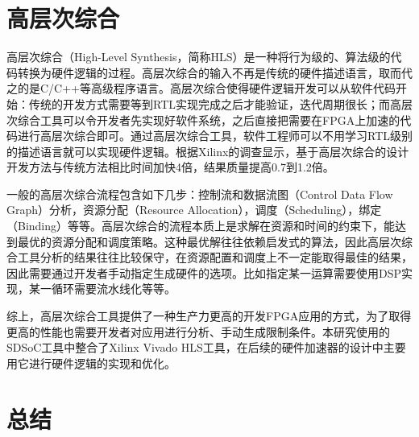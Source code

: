 \section{高层次综合}

高层次综合（High-Level Synthesis，简称HLS）是一种将行为级的、算法级的代码转换为硬件逻辑的过程。高层次综合的输入不再是传统的硬件描述语言，取而代之的是C/C++等高级程序语言。高层次综合使得硬件逻辑开发可以从软件代码开始：传统的开发方式需要等到RTL实现完成之后才能验证，迭代周期很长；而高层次综合工具可以令开发者先实现好软件系统，之后直接把需要在FPGA上加速的代码进行高层次综合即可。通过高层次综合工具，软件工程师可以不用学习RTL级别的描述语言就可以实现硬件逻辑。根据Xilinx的调查显示，基于高层次综合的设计开发方法与传统方法相比时间加快4倍，结果质量提高0.7到1.2倍。

一般的高层次综合流程包含如下几步：控制流和数据流图（Control Data Flow Graph）分析，资源分配（Resource Allocation），调度（Scheduling），绑定（Binding）等等。高层次综合的流程本质上是求解在资源和时间的约束下，能达到最优的资源分配和调度策略。这种最优解往往依赖启发式的算法，因此高层次综合工具分析的结果往往比较保守，在资源配置和调度上不一定能取得最佳的结果，因此需要通过开发者手动指定生成硬件的选项。比如指定某一运算需要使用DSP实现，某一循环需要流水线化等等。

综上，高层次综合工具提供了一种生产力更高的开发FPGA应用的方式，为了取得更高的性能也需要开发者对应用进行分析、手动生成限制条件。本研究使用的SDSoC工具中整合了Xilinx Vivado HLS工具，在后续的硬件加速器的设计中主要用它进行硬件逻辑的实现和优化。

\section{总结}

